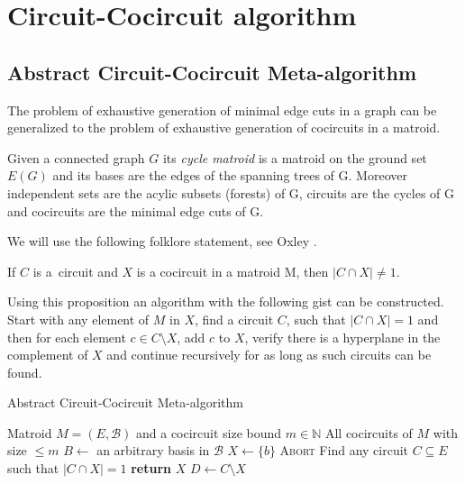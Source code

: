 \chapter{Circuit-Cocircuit algorithm}
\label{ch:algorithm}

\section{Abstract Circuit-Cocircuit Meta-algorithm}

The problem of exhaustive generation of minimal edge cuts in \linebreak a graph can be generalized to the problem of exhaustive generation of cocircuits in a matroid.

\begin{defn}
	\label{defn:cycle_matroid}
	Given a connected graph $G$ its \textit{cycle matroid} is a matroid on the ground set $E(G)$ and its bases are the edges of the spanning trees of G. Moreover independent sets are the acylic subsets (forests) of G, circuits are the cycles of G and cocircuits are the minimal edge cuts of G.
\end{defn}

We will use the following folklore statement, see Oxley \cite{oxley2006matroid}.

\begin{prop}
	\label{prop_circuit-cocircuit}
	If $C$ is a~circuit and $X$ is a cocircuit in a matroid M, then ${\lvert C \cap X \rvert \neq 1}$.
\end{prop}

Using this proposition an algorithm with the following gist can be constructed. Start with any element of $M$ in $X$, find a circuit $C$, such that \linebreak ${\lvert C \cap X \rvert = 1}$ and then for each element $c \in C \setminus X$, add $c$ to $X$, verify there is a hyperplane in the complement of $X$ and continue recursively for as long as such circuits can be found.

\clearpage

\begin{algorithm}
	\caption{Abstract Circuit-Cocircuit Meta-algorithm}
	\label{alg:meta}
\begin{algorithmic}[1]
	\Require Matroid $M = (E, \mathcal{B})$ and a cocircuit size bound $m \in \mathbb{N}$
	\Ensure All cocircuits of $M$ with size $\leq m$
	\State $B \leftarrow$ an arbitrary basis in $\mathcal{B}$
		\State $X \leftarrow \{b\}$
		\State {}
	\EndFor
		\State \textsc{Abort}
	\EndIf
	\State Find any circuit $C \subseteq E$ such that $\lvert C \cap X \rvert = 1$
		\State \textbf{return} $X$ 
	\Else
		\State $D \leftarrow C \setminus X$
			\State {}
		\EndFor
	\EndIf

	\EndProcedure
\end{algorithmic}
\end{algorithm}


